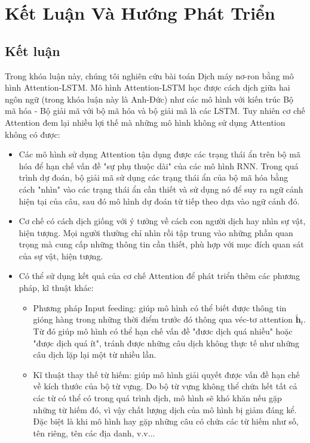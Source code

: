 \chapter{Kết Luận Và Hướng Phát Triển}
\ifpdf
    \graphicspath{{Chapter5/Chapter5Figs/PNG/}{Chapter5/Chapter5Figs/PDF/}{Chapter5/Chapter5Figs/}}
\else
    \graphicspath{{Chapter5/Chapter5Figs/EPS/}{Chapter5/Chapter5Figs/}}
\fi
\label{chap_5}

\section{Kết luận}

Trong khóa luận này, chúng tôi nghiên cứu bài toán Dịch máy nơ-ron bằng mô hình Attention-LSTM. Mô hình Attention-LSTM học được cách dịch giữa hai ngôn ngữ (trong khóa luận này là Anh-Đức) như các mô hình với kiến trúc Bộ mã hóa - Bộ giải mã với bộ mã hóa và bộ giải mã là các LSTM. Tuy nhiên cơ chế Attention đem lại nhiều lợi thế mà những mô hình không sử dụng Attention không có được:
\begin{itemize}
	\item Các mô hình sử dụng Attention tận dụng được các trạng thái ẩn trên bộ mã hóa để hạn chế vấn đề "sự phụ thuộc dài" của các mô hình RNN. Trong quá trình dự đoán, bộ giải mã sử dụng các trạng thái ẩn của bộ mã hóa bằng cách "nhìn" vào các trạng thái ẩn cần thiết và sử dụng nó để suy ra ngữ cảnh hiện tại của câu, sau đó mô hình dự đoán từ tiếp theo dựa vào ngữ cảnh đó.
	\item Cơ chế có cách dịch giống với ý tưởng về cách con người dịch hay nhìn sự vật, hiện tượng. Mọi người thường chỉ nhìn rồi tập trung vào những phần quan trọng mà cung cấp những thông tin cần thiết, phù hợp với mục đích quan sát của sự vật, hiện tượng.
	\item Có thể sử dụng kết quả của cơ chế Attention để phát triển thêm các phương pháp, kĩ thuật khác:
	\begin{itemize}
		\item Phương pháp Input feeding: giúp mô hình có thể biết được thông tin gióng hàng trong những thời điểm trước đó thông qua véc-tơ attention $\bm{\tilde{h}}_t$. Từ đó giúp mô hình có thể hạn chế vấn đề "đươc dịch quá nhiều" hoặc "được dịch quá ít", tránh được những câu dịch không thực tế như những câu dịch lặp lại một từ nhiều lần.
		\item Kĩ thuật thay thế từ hiếm: giúp mô hình giải quyết được vấn đề hạn chế về kích thước của bộ từ vựng. Do bộ từ vựng không thể chứa hết tất cả các từ có thể có trong quá trình dịch, mô hình sẽ khó khăn nếu gặp những từ hiếm đó, vì vậy chất lượng dịch của mô hình bị giảm đáng kể. Đặc biệt là khi mô hình hay gặp những câu có chứa các từ hiếm như số, tên riêng, tên các địa danh, v.v... 
	\end{itemize}
\end{itemize}

